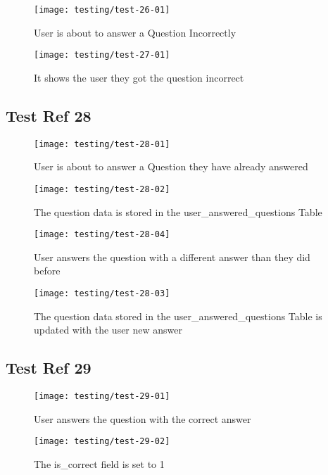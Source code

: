 \begin{figure}[H]
\centering
\texttt{[image: testing/test-26-01]}
\caption{User is about to answer a Question Incorrectly}
\label{test-27-01}
\end{figure}

\begin{figure}[H]
\centering
\texttt{[image: testing/test-27-01]}
\caption{It shows the user they got the question incorrect}
\label{test-27-02}
\end{figure}

\subsection{Test Ref 28}

\begin{figure}[H]
\centering
\texttt{[image: testing/test-28-01]}
\caption{User is about to answer a Question they have already answered}
\label{test-28-01}
\end{figure}

\begin{figure}[H]
\centering
\texttt{[image: testing/test-28-02]}
\caption{The question data is stored in the user\_answered\_questions Table}
\label{test-28-01}
\end{figure}

\begin{figure}[H]
\centering
\texttt{[image: testing/test-28-04]}
\caption{User answers the question with a different answer than they did before}
\label{test-28-01}
\end{figure}

\begin{figure}[H]
\centering
\texttt{[image: testing/test-28-03]}
\caption{The question data stored in the user\_answered\_questions Table is updated with the user new answer}
\label{test-28-01}
\end{figure}

\subsection{Test Ref 29}

\begin{figure}[H]
\centering
\texttt{[image: testing/test-29-01]}
\caption{User answers the question with the correct answer}
\label{test-29-01}
\end{figure}

\begin{figure}[H]
\centering
\texttt{[image: testing/test-29-02]}
\caption{The is\_correct field is set to 1}
\label{test-29-01}
\end{figure}

